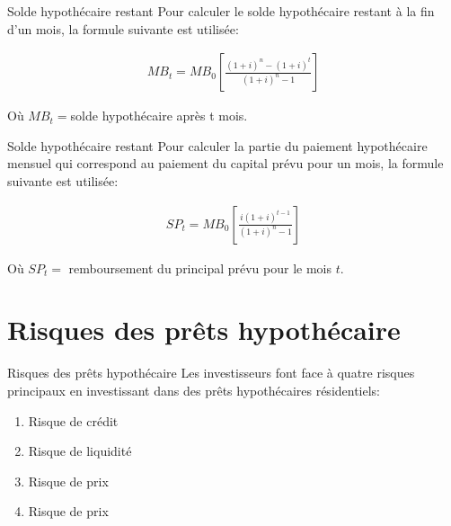 \documentclass[10pt,a4paper]{beamer}
\begin{document}
\begin{frame}{Solde hypothécaire restant}
Pour calculer le solde hypothécaire restant à la fin d'un mois, la formule suivante est utilisée:

\vspace{0.5cm}

\begin{align*}
MB_t=MB_0 \left[ \frac{(1+i)^n-(1+i)^t}{(1+i)^n-1} \right]
\end{align*}

\vspace{0.5cm}

Où $MB_t=$solde hypothécaire après t mois.

\end{frame}

\begin{frame}{Solde hypothécaire restant}
Pour calculer la partie du paiement hypothécaire mensuel qui correspond au paiement du capital prévu pour un mois, la formule suivante est utilisée: 

\vspace{0.5cm}

\begin{align*}
SP_t=MB_0 \left[ \frac{i(1+i)^{t-1}}{(1+i)^n-1} \right]
\end{align*}

\vspace{0.5cm}
Où $SP_t=$ remboursement du principal prévu pour le mois $t$.

\end{frame}

\section{Risques des prêts hypothécaire}


\begin{frame}{Risques des prêts hypothécaire}
Les investisseurs font face à quatre risques principaux en investissant dans des prêts hypothécaires résidentiels: 
\begin{enumerate}[label=\arabic*)]
\item Risque de crédit
\item Risque de liquidité
\item Risque de prix 
\item Risque de prix 
\end{enumerate}
\end{frame}
\end{document}
